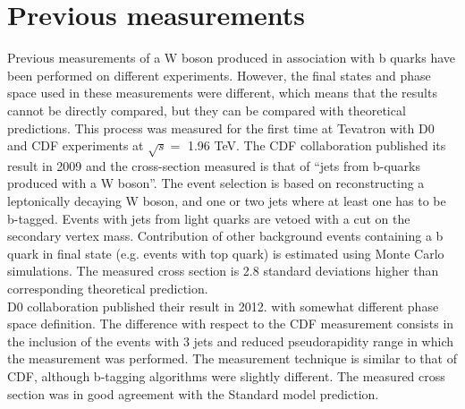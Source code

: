 
\section{Previous measurements}
\label{sec:2.3}
	\par Previous measurements of a W boson produced in association with b quarks have been performed on different experiments. However, the final states and phase space used in these measurements were different, which means that the results cannot be directly compared, but they can be compared with theoretical predictions. This process was measured for the first time at Tevatron with D0 and CDF experiments at $\sqrt{s} =$ 1.96 TeV. The CDF collaboration published its result in 2009 and the cross-section measured is that of “jets from b-quarks produced with a W boson”\cite{Aaltonen:2009qi}. The event selection is based on reconstructing a leptonically decaying W boson, and one or two jets where at least one has to be b-tagged. Events with jets from light quarks are vetoed with a cut on the secondary vertex mass. Contribution of other background events containing a b quark in final state (e.g. events with top quark) is estimated using Monte Carlo simulations. The measured cross section is 2.8 standard deviations higher than corresponding theoretical prediction. \\
	D0 collaboration published their result in 2012. with somewhat different phase space definition\citep{D0:2012qt}. The difference with respect to the CDF measurement consists in the inclusion of the events with 3 jets and reduced pseudorapidity range in which the measurement was performed. The measurement technique is similar to that of CDF, although b-tagging algorithms were slightly different. The measured cross section was in good agreement with the Standard model prediction.\\
